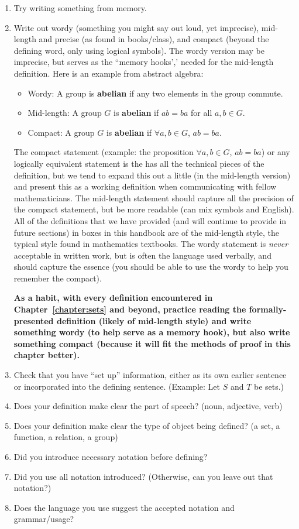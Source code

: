 \documentclass{book}
\theoremstyle{ekimcustom}
\begin{document}
\begin{enumerate}
\item Try writing something from memory.
\item Write out wordy (something you might say out loud, yet imprecise), mid-length and precise (as found in books/class), and compact (beyond the defining word, only using logical symbols). The wordy version may be imprecise, but serves as the ``memory hooks',' needed for the mid-length definition. Here is an example from abstract algebra:
\begin{itemize}
\item Wordy: A group is {\bf abelian} if any two elements in the group commute.
\item Mid-length: A group $G$ is {\bf abelian} if $ab=ba$ for all $a,b \in G$.
\item Compact: A group $G$ is {\bf abelian} if $\forall a,b \in G$, $ab=ba$.
\end{itemize}
The compact statement (example: the proposition $\forall a,b \in G$, $ab=ba$) or any logically equivalent statement is the has all the technical pieces of the definition, but we tend to expand this out a little (in the mid-length version) and present this as a working definition when communicating with fellow mathematicians. The mid-length statement should capture all the precision of the compact statement, but be more readable (can mix symbols and English). All of the definitions that we have provided (and will continue to provide in future sections) in boxes in this handbook are of the mid-length style, the typical style found in mathematics textbooks. The wordy statement is \emph{never} acceptable in written work, but is often the language used verbally, and should capture the essence (you should be able to use the wordy to help you remember the compact).

{\bf As a habit, with every definition encountered in Chapter~\ref{chapter:sets} and beyond, practice reading the formally-presented definition (likely of mid-length style) and write something wordy (to help serve as a memory hook), but also write something compact (because it will fit the methods of proof in this chapter better).}

\item Check that you have ``set up'' information, either as its own earlier sentence or incorporated into the defining sentence. (Example: Let $S$ and $T$ be sets.)
\item Does your definition make clear the part of speech? (noun, adjective, verb)
\item Does your definition make clear the type of object being defined? (a set, a function, a relation, a group)
\item Did you introduce necessary notation before defining?
\item Did you use all notation introduced? (Otherwise, can you leave out that notation?)
\item Does the language you use suggest the accepted notation and grammar/usage?
\end{enumerate}
\end{document}
